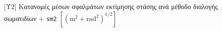 \begin{frame}{\footnotesize [Υ2] Κατανομές μέσων σφαλμάτων εκτίμησης στάσης ανά μέθοδο διαλογής σωματιδίων $+$ \texttt{sm2} $[(\text{m}^2+\text{rad}^2)^{1/2}]$}

  \begin{figure}
    
  \end{figure}
  \vspace{-0.8cm}
  \begin{figure}
    
  \end{figure}


\end{frame}
